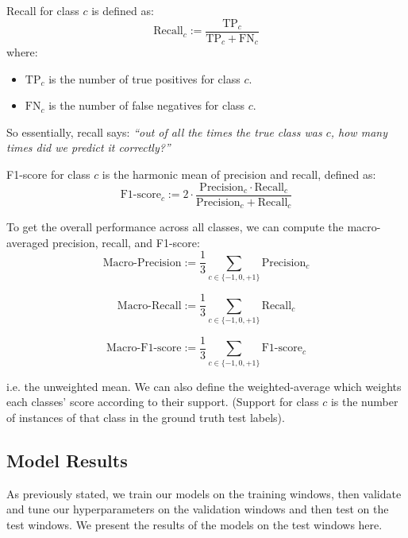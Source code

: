 Recall for class $c$ is defined as:
\begin{equation}
\text{Recall}_c := \frac{\text{TP}_c}{\text{TP}_c + \text{FN}_c}
\end{equation}
where:
\begin{itemize}
    \item $ \text{TP}_c $ is the number of true positives for class $c$.
    \item $ \text{FN}_c $ is the number of false negatives for class $c$.
\end{itemize}
So essentially, recall says: \textit{``out of all the times the true class was $c$, how many times did we predict it correctly?''}

F1-score for class $ c $ is the harmonic mean of precision and recall, defined as:
\begin{equation}
\text{F1-score}_c := 2 \cdot \frac{\text{Precision}_c \cdot \text{Recall}_c}{\text{Precision}_c + \text{Recall}_c}
\end{equation}

To get the overall performance across all classes, we can compute the macro-averaged precision, recall, and F1-score:
\begin{equation}
\text{Macro-Precision} := \frac{1}{3} \sum_{c \in \{-1,0,+1\}} \text{Precision}_c
\end{equation}

\begin{equation}
\text{Macro-Recall} := \frac{1}{3} \sum_{c \in \{-1,0,+1\}} \text{Recall}_c
\end{equation}

\begin{equation}
\text{Macro-F1-score} := \frac{1}{3} \sum_{c \in \{-1,0,+1\}} \text{F1-score}_c
\end{equation}

i.e. the unweighted mean. We can also define the weighted-average which weights each classes'
score according to their support. (Support for class $c$ is the number of instances of that class in the ground truth test labels).

\subsection{Model Results}
As previously stated, we train our models on the training windows, then validate
and tune our hyperparameters on the validation windows and then test on the test windows.
We present the results of the models on the test windows here.

